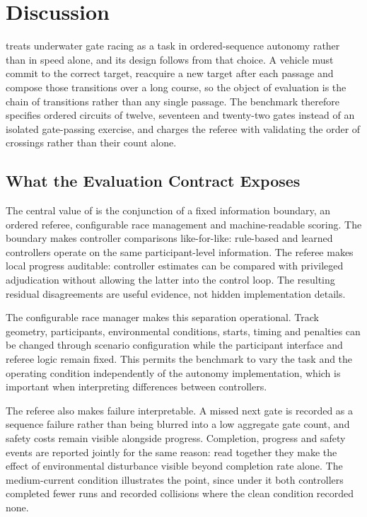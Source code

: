 \section{Discussion}
\label{sec:discussion}

\mra{} treats underwater gate racing as a task in ordered-sequence autonomy
rather than in speed alone, and its design follows from that choice. A vehicle
must commit to the correct target, reacquire a new target after each passage and
compose those transitions over a long course, so the object of evaluation is the
chain of transitions rather than any single passage. The benchmark therefore
specifies ordered circuits of twelve, seventeen and twenty-two gates instead of
an isolated gate-passing exercise, and charges the referee with validating the
order of crossings rather than their count alone.

\subsection{What the Evaluation Contract Exposes}

The central value of \mra{} is the conjunction of a fixed information boundary,
an ordered referee, configurable race management and machine-readable scoring.
The boundary makes controller comparisons like-for-like: rule-based and learned
controllers operate on the same participant-level information. The referee makes
local progress auditable: controller estimates can be compared with privileged
adjudication without allowing the latter into the control loop. The resulting
residual disagreements are useful evidence, not hidden implementation details.

The configurable race manager makes this separation operational. Track
geometry, participants, environmental conditions, starts, timing and penalties
can be changed through scenario configuration while the participant interface
and referee logic remain fixed. This permits the benchmark to vary the task and
the operating condition independently of the autonomy implementation, which is
important when interpreting differences between controllers.

The referee also makes failure interpretable. A missed next gate is recorded as
a sequence failure rather than being blurred into a low aggregate gate count,
and safety costs remain visible alongside progress. Completion, progress and
safety events are reported jointly for the same reason: read together they make
the effect of environmental disturbance visible beyond completion rate alone.
The medium-current condition illustrates the point, since under it both
controllers completed fewer runs and recorded collisions where the clean
condition recorded none.

